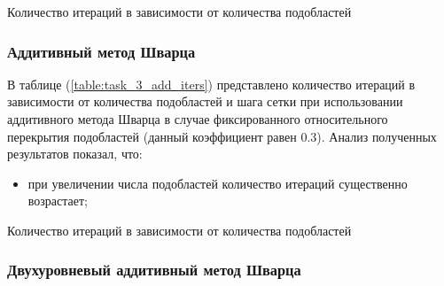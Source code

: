 \documentclass[a4paper]{article}
\begin{document}
\begin{table}[h]
\caption{Количество итераций в зависимости от количества подобластей}
\label{table:task_3_mult_iters}
\end{table}

\subsubsection{Аддитивный метод Шварца}

В таблице (\ref{table:task_3_add_iters}) представлено количество итераций в зависимости от количества подобластей и шага сетки при использовании аддитивного метода Шварца в случае фиксированного относительного перекрытия подобластей (данный коэффициент равен 0.3). Анализ полученных результатов показал, что:
\begin{itemize}
\item при увеличении числа подобластей количество итераций существенно возрастает;
\end{itemize}

\begin{table}[h]
\caption{Количество итераций в зависимости от количества подобластей}
\label{table:task_3_add_iters}
\end{table}

\subsubsection{Двухуровневый аддитивный метод Шварца}
\end{document}
